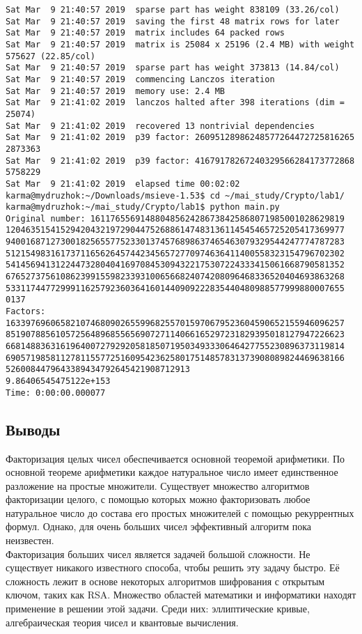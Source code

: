 \documentclass[12pt]{article}
\begin{document}
\begin{lstlisting}
Sat Mar  9 21:40:57 2019  sparse part has weight 838109 (33.26/col)
Sat Mar  9 21:40:57 2019  saving the first 48 matrix rows for later
Sat Mar  9 21:40:57 2019  matrix includes 64 packed rows
Sat Mar  9 21:40:57 2019  matrix is 25084 x 25196 (2.4 MB) with weight
575627 (22.85/col)
Sat Mar  9 21:40:57 2019  sparse part has weight 373813 (14.84/col)
Sat Mar  9 21:40:57 2019  commencing Lanczos iteration
Sat Mar  9 21:40:57 2019  memory use: 2.4 MB
Sat Mar  9 21:41:02 2019  lanczos halted after 398 iterations (dim =
25074)
Sat Mar  9 21:41:02 2019  recovered 13 nontrivial dependencies
Sat Mar  9 21:41:02 2019  p39 factor: 26095128986248577264472725816265
2873363
Sat Mar  9 21:41:02 2019  p39 factor: 41679178267240329566284173772868
5758229
Sat Mar  9 21:41:02 2019  elapsed time 00:02:02
karma@mydruzhok:~/Downloads/msieve-1.53$ cd ~/mai_study/Crypto/lab1/
karma@mydruzhok:~/mai_study/Crypto/lab1$ python main.py 
Original number: 161176556914880485624286738425868071985001028629819
12046351541529420432197290447526886147483136114545465725205417369977
94001687127300182565577523301374576898637465463079329544247774787283
51215498316173711656264574423456572770974636411400558323154796702302
54145694131224473280404169708453094322175307224333415061668790581352
67652737561086239915598233931006566824074208096468336520404693863268
53311744772999116257923603641601440909222835440480988577999880007655
0137
Factors:
16339769606582107468090265599682557015970679523604590652155946096257
85190788561057256489685565690727114066165297231829395018127947226623
66814883631619640072792920581850719503493330646427755230896373119814
69057198581127811557725160954236258017514857831373908089824469638166
5260084479643389434792645421908712913
9.86406545475122e+153
Time: 0:00:00.000077
\end{lstlisting}

\subsection*{Выводы}
Факторизация целых чисел обеспечивается основной теоремой арифметики. По основной теореме арифметики каждое натуральное число имеет единственное разложение на простые множители. Существует множество алгоритмов факторизации целого, с помощью которых можно факторизовать любое натуральное число до состава его простых множителей с помощью рекуррентных формул. Однако, для очень больших чисел эффективный алгоритм пока неизвестен.\\ 
Факторизация больших чисел является задачей большой сложности. Не существует никакого известного способа, чтобы решить эту задачу быстро. Её сложность лежит в основе некоторых алгоритмов шифрования с открытым ключом, таких как RSA. Множество областей математики и информатики находят применение в решении этой задачи. Среди них: эллиптические кривые, алгебраическая теория чисел и квантовые вычисления. 
\end{document}
